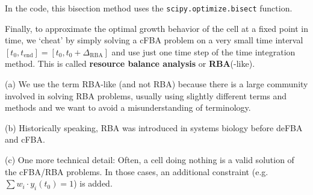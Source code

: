 \documentclass{article}
\begin{document}
{\color{gray}
In the code, this bisection method uses the \texttt{scipy.optimize.bisect} function.
}
%

%
Finally, to approximate the optimal growth behavior of the cell at a fixed point in time, we \lq cheat\rq{} by simply solving a cFBA problem on a very small time interval $[t_0,t_{\mathrm{end}}] = [t_0, t_0 + \Delta_{\mathrm{RBA}}]$ and use just one time step of the time integration method.
This is called \textbf{resource balance analysis} or \textbf{RBA}(-like).

{\color{gray}
(a) We use the term RBA-like (and not RBA) because there is a large community involved in solving RBA problems, usually using slightly different terms and methods and we want to avoid a misunderstanding of terminology.

(b) Historically speaking, RBA was introduced in systems biology before deFBA and cFBA.

(c) One more technical detail: Often, a cell doing nothing is a valid solution of the cFBA\slash RBA problems.
In those cases, an additional constraint (e.g.\ $\sum w_i \cdot y_i (t_0) = 1$) is added.
}
\end{document}
